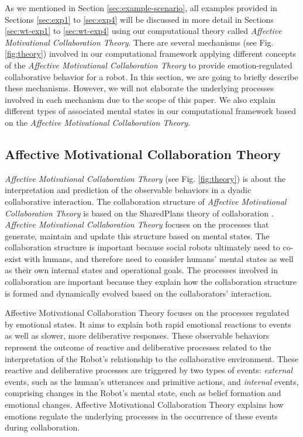 As we mentioned in Section \ref{sec:example-scenario}, all examples provided in
Sections \ref{sec:exp1} to \ref{sec:exp4} will be discussed in more detail in
Sections \ref{sec:wt-exp1} to \ref{sec:wt-exp4} using our computational theory
called \textit{Affective Motivational Collaboration Theory}. There are several
mechanisms (see Fig. \ref{fig:theory}) involved in our computational framework
applying different concepts of the \textit{Affective Motivational Collaboration
Theory} to provide emotion-regulated collaborative behavior for a robot. In this
section, we are going to briefly describe these mechanisms. However, we will not
elaborate the underlying processes involved in each mechanism due to the scope
of this paper. We also explain different types of associated mental states in
our computational framework based on the \textit{Affective Motivational
Collaboration Theory}.

\subsection{Affective Motivational Collaboration Theory}
\label{sec:AMCT}

\textit{Affective Motivational Collaboration Theory} (see Fig. \ref{fig:theory})
is about the interpretation and prediction of the observable behaviors in a
dyadic collaborative interaction. The collaboration structure of
\textit{Affective Motivational Collaboration Theory} is based on the SharedPlans
theory of collaboration
\cite{grosz:planning-acting,grosz:collaboration,grosz:plans-discourse}.
\textit{Affective Motivational Collaboration Theory} focuses on the processes
that generate, maintain and update this structure based on mental states. The
collaboration structure is important because social robots ultimately need to
co-exist with humans, and therefore need to consider humans' mental states as
well as their own internal states and operational goals. The processes involved
in collaboration are important because they explain how the collaboration
structure is formed and dynamically evolved based on the collaborators'
interaction.

Affective Motivational Collaboration Theory focuses on the processes regulated
by emotional states. It aims to explain both rapid emotional reactions to events
as well as slower, more deliberative responses. These observable behaviors
represent the outcome of reactive and deliberative processes related to the
interpretation of the Robot's relationship to the collaborative environment.
These reactive and deliberative processes are triggered by two types of events:
\textit{external} events, such as the human's utterances and primitive actions,
and \textit{internal} events, comprising changes in the Robot's mental state,
such as belief formation and emotional changes. Affective Motivational
Collaboration Theory explains how emotions regulate the underlying processes in
the occurrence of these events during collaboration.

